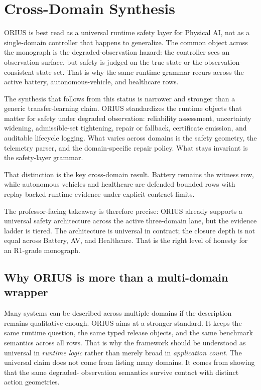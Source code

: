 \section{Cross-Domain Synthesis}
\label{sec:prof-cross-domain}

ORIUS is best read as a universal runtime safety layer for Physical AI, not as a
single-domain controller that happens to generalize.  The common object across the
monograph is the degraded-observation hazard: the controller sees an observation
surface, but safety is judged on the true state or the observation-consistent
state set.  That is why the same runtime grammar recurs across the active
battery, autonomous-vehicle, and healthcare rows.



The synthesis that follows from this status is narrower and stronger than a generic
transfer-learning claim.  ORIUS standardizes the runtime objects that matter for
safety under degraded observation:
reliability assessment, uncertainty widening, admissible-set tightening, repair or
fallback, certificate emission, and auditable lifecycle logging.  What varies across
domains is the safety geometry, the telemetry parser, and the domain-specific repair
policy.  What stays invariant is the safety-layer grammar.

That distinction is the key cross-domain result.  Battery remains the witness row,
while autonomous vehicles and healthcare are defended bounded rows with replay-backed
runtime evidence under explicit contract limits.

The professor-facing takeaway is therefore precise: ORIUS already supports a
universal safety architecture across the active three-domain lane, but the evidence
ladder is tiered.  The architecture is universal in contract; the closure depth is
not equal across Battery, AV, and Healthcare.  That is the right level of honesty
for an R1-grade monograph.

\subsection{Why ORIUS is more than a multi-domain wrapper}
Many systems can be described across multiple domains if the description remains
qualitative enough. ORIUS aims at a stronger standard. It keeps the same runtime
question, the same typed release objects, and the same benchmark semantics across all
rows. That is why the framework should be understood as universal in \emph{runtime
logic} rather than merely broad in \emph{application count}. The universal claim does
not come from listing many domains. It comes from showing that the same degraded-
observation semantics survive contact with distinct action geometries.

